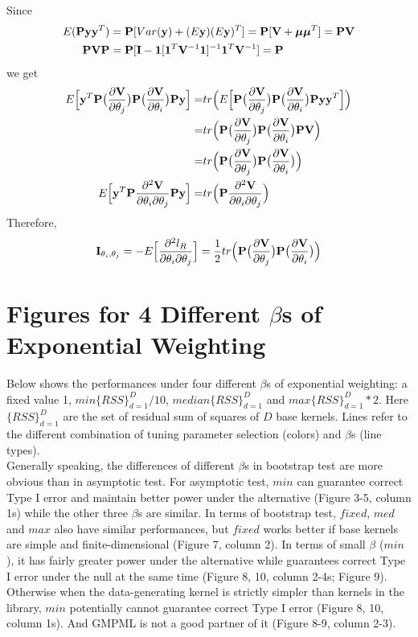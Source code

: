 \documentclass[11pt]{article}
\begin{document}
Since 
\begin{align*}
E({\bf P} {\bf y} {\bf y}^T)&={\bf P} [Var({\bf y})+(E{\bf y})(E{\bf y})^T]={\bf P} [{\bf V}+\boldsymbol{\mu} \boldsymbol{\mu}^T]={\bf P} {\bf V} \\
{\bf P} {\bf V} {\bf P}&={\bf P}[{\bf I}-\mathbf{1}[\mathbf{1}^T{\bf V}^{-1}\mathbf{1}]^{-1}\mathbf{1}^T{\bf V}^{-1}]={\bf P}
\end{align*}
we get
\begin{align*}
E\Big[{\bf y}^T {\bf P}\big(\frac{\partial {\bf V}}{\partial \theta_j}\big){\bf P} \big(\frac{\partial {\bf V}}{\partial \theta_i}\big){\bf P} {\bf y} \Big]=&tr\Big(E\Big[{\bf P}\big(\frac{\partial {\bf V}}{\partial \theta_j}\big){\bf P} \big(\frac{\partial {\bf V}}{\partial \theta_i}\big){\bf P} {\bf y} {\bf y}^T \Big] \Big)\\
=&tr\Big({\bf P}\big(\frac{\partial {\bf V}}{\partial \theta_j}\big){\bf P} \big(\frac{\partial {\bf V}}{\partial \theta_i}\big){\bf P} {\bf V} \Big)\\
=&tr\Big({\bf P}\big(\frac{\partial {\bf V}}{\partial \theta_j}\big){\bf P} \big(\frac{\partial {\bf V}}{\partial \theta_i}\big)\Big)\\
E\Big[{\bf y}^T {\bf P}\frac{\partial^2 {\bf V}}{\partial \theta_i \partial \theta_j}{\bf P} {\bf y} \Big]=&tr\Big({\bf P}\frac{\partial^2 {\bf V}}{\partial \theta_i \partial \theta_j}\Big)
\end{align*}
Therefore, 
\begin{align*}
{\bf I}_{\theta_i, \theta_j}=-E\Big[\frac{\partial^2 l_R}{\partial \theta_i \partial \theta_j}\Big]=\frac{1}{2}tr\Big({\bf P}\big(\frac{\partial {\bf V}}{\partial \theta_j}\big){\bf P} \big(\frac{\partial {\bf V}}{\partial \theta_i}\big)\Big)
\end{align*}


\section{{\bf Figures for 4 Different $\beta$s of Exponential Weighting}}
Below shows the performances under four different $\beta$s of exponential weighting: a fixed value 1, $min\{RSS\} _{d=1}^D/10$, $median\{RSS\} _{d=1}^D$ and $max\{RSS\} _{d=1}^D * 2$. Here $\{RSS\} _{d=1}^D$ are the set of residual sum of squares of $D$ base kernels. Lines refer to the different combination of tuning parameter selection (colors) and $\beta$s (line types).\\

Generally speaking, the differences of different $\beta$s in bootstrap test are more obvious than in asymptotic test. For asymptotic test, $min$ can guarantee correct Type I error and maintain better power under the alternative (Figure 3-5, column 1s) while the other three $\beta$s are similar. In terms of bootstrap test, $fixed$, $med$ and $max$ also have similar performances, but $fixed$ works better if base kernels are simple and finite-dimensional (Figure 7, column 2). In terms of small $\beta$ ($min$), it has fairly greater power under the alternative while guarantees correct Type I error under the null at the same time (Figure 8, 10, column 2-4s; Figure 9). Otherwise when the data-generating kernel is strictly simpler than kernels in the library, $min$ potentially cannot guarantee correct Type I error (Figure 8, 10, column 1s). And GMPML is not a good partner of it (Figure 8-9, column 2-3).
\end{document}
